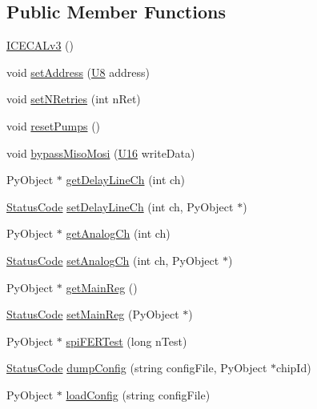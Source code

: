\subsection*{Public Member Functions}
\begin{DoxyCompactItemize}
\item 
\hyperlink{classICECALv3_a0a8b12d2b6bafca9cd820301fc93dff8}{I\+C\+E\+C\+A\+Lv3} ()
\item 
void \hyperlink{classICECALv3_aaf38119f47401a85022ae1b0d05675bd}{set\+Address} (\hyperlink{ICECALv3_8h_a3cb25ca6f51f003950f9625ff05536fc}{U8} address)
\item 
void \hyperlink{classICECALv3_aae0b7539c0bba5311aab99e000d1be6d}{set\+N\+Retries} (int n\+Ret)
\item 
void \hyperlink{classICECALv3_a1b9ca0e09d45634a70da6f19a7257314}{reset\+Pumps} ()
\item 
void \hyperlink{classICECALv3_a5ce36881aa89fedf7c37e03620acca6e}{bypass\+Miso\+Mosi} (\hyperlink{ICECALv3_8h_adf928e51a60dba0df29d615401cc55a8}{U16} write\+Data)
\item 
Py\+Object $\ast$ \hyperlink{classICECALv3_a7a1c1706a455903f42bb9a5257d94a78}{get\+Delay\+Line\+Ch} (int ch)
\item 
\hyperlink{classStatusCode}{Status\+Code} \hyperlink{classICECALv3_a14a7a29c9a3412c062f053cc616b860a}{set\+Delay\+Line\+Ch} (int ch, Py\+Object $\ast$)
\item 
Py\+Object $\ast$ \hyperlink{classICECALv3_a5f1414e6049a82eafdd505a88d7d0c91}{get\+Analog\+Ch} (int ch)
\item 
\hyperlink{classStatusCode}{Status\+Code} \hyperlink{classICECALv3_a9578e4d13c250d8bc417f68c79d6a21d}{set\+Analog\+Ch} (int ch, Py\+Object $\ast$)
\item 
Py\+Object $\ast$ \hyperlink{classICECALv3_a4a414d23c1e199b446dc876161338148}{get\+Main\+Reg} ()
\item 
\hyperlink{classStatusCode}{Status\+Code} \hyperlink{classICECALv3_a479f7e17669da4b785af840049d39cb4}{set\+Main\+Reg} (Py\+Object $\ast$)
\item 
Py\+Object $\ast$ \hyperlink{classICECALv3_a8639cf6a44cba85b53128b5e1dc21e15}{spi\+F\+E\+R\+Test} (long n\+Test)
\item 
\hyperlink{classStatusCode}{Status\+Code} \hyperlink{classICECALv3_ac26be912fb72e615106fceb4626aa548}{dump\+Config} (string config\+File, Py\+Object $\ast$chip\+Id)
\item 
Py\+Object $\ast$ \hyperlink{classICECALv3_a514456dd303e897aa1b55dccf3fa66d0}{load\+Config} (string config\+File)

\end{DoxyCompactItemize}
